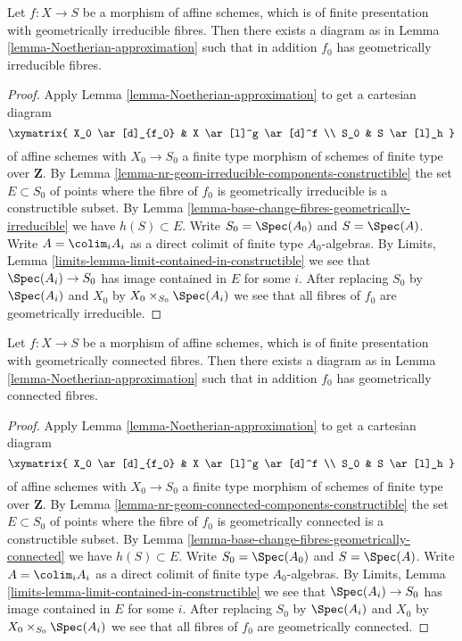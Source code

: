 \begin{lemma}
\label{lemma-Noetherian-approximation-geometrically-irreducible}
Let $f : X \to S$ be a morphism of affine schemes, which is
of finite presentation with geometrically irreducible fibres.
Then there exists a diagram as in
Lemma \ref{lemma-Noetherian-approximation}
such that in addition $f_0$ has geometrically irreducible fibres.
\end{lemma}

\begin{proof}
Apply
Lemma \ref{lemma-Noetherian-approximation}
to get a cartesian diagram
$$
\xymatrix{
X_0 \ar[d]_{f_0} & X \ar[l]^g \ar[d]^f \\
S_0 & S \ar[l]_h
}
$$
of affine schemes with $X_0 \to S_0$ a finite type morphism of
schemes of finite type over $\mathbf{Z}$. By
Lemma \ref{lemma-nr-geom-irreducible-components-constructible}
the set $E \subset S_0$ of points where the fibre of
$f_0$ is geometrically irreducible is a constructible subset. By
Lemma \ref{lemma-base-change-fibres-geometrically-irreducible}
we have $h(S) \subset E$. Write $S_0 = \Spec(A_0)$ and
$S = \Spec(A)$. Write $A = \colim_i A_i$ as a
direct colimit of finite type $A_0$-algebras. By
Limits, Lemma \ref{limits-lemma-limit-contained-in-constructible}
we see that $\Spec(A_i) \to S_0$ has image contained in $E$
for some $i$. After replacing $S_0$ by $\Spec(A_i)$ and
$X_0$ by $X_0 \times_{S_0} \Spec(A_i)$ we see that
all fibres of $f_0$ are geometrically irreducible.
\end{proof}

\begin{lemma}
\label{lemma-Noetherian-approximation-geometrically-connected}
Let $f : X \to S$ be a morphism of affine schemes, which is
of finite presentation with geometrically connected fibres.
Then there exists a diagram as in
Lemma \ref{lemma-Noetherian-approximation}
such that in addition $f_0$ has geometrically connected fibres.
\end{lemma}

\begin{proof}
Apply
Lemma \ref{lemma-Noetherian-approximation}
to get a cartesian diagram
$$
\xymatrix{
X_0 \ar[d]_{f_0} & X \ar[l]^g \ar[d]^f \\
S_0 & S \ar[l]_h
}
$$
of affine schemes with $X_0 \to S_0$ a finite type morphism of
schemes of finite type over $\mathbf{Z}$. By
Lemma \ref{lemma-nr-geom-connected-components-constructible}
the set $E \subset S_0$ of points where the fibre of
$f_0$ is geometrically connected is a constructible subset. By
Lemma \ref{lemma-base-change-fibres-geometrically-connected}
we have $h(S) \subset E$. Write $S_0 = \Spec(A_0)$ and
$S = \Spec(A)$. Write $A = \colim_i A_i$ as a
direct colimit of finite type $A_0$-algebras. By
Limits, Lemma \ref{limits-lemma-limit-contained-in-constructible}
we see that $\Spec(A_i) \to S_0$ has image contained in $E$
for some $i$. After replacing $S_0$ by $\Spec(A_i)$ and
$X_0$ by $X_0 \times_{S_0} \Spec(A_i)$ we see that
all fibres of $f_0$ are geometrically connected.
\end{proof}

